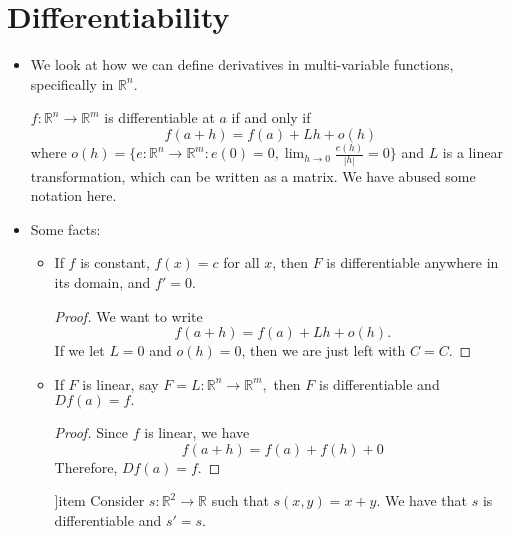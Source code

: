 \section{Differentiability}
\begin{itemize}
    \item We look at how we can define derivatives in multi-variable functions, specifically in $\mathbb{R}^n$.
    \begin{definition}
        $f:\mathbb{R}^n\rightarrow \mathbb{R}^m$ is differentiable at $a$ if and only if
        \begin{equation}
            f(a+h) = f(a) + Lh + o(h)
        \end{equation}
        where $o(h) = \{e:\mathbb{R}^n\rightarrow \mathbb{R}^m : e(0)=0, \lim_{h\to 0} \frac{e(h)}{|h|} = 0\}$ and $L$ is a linear transformation, which can be written as a matrix. We have abused some notation here.
    \end{definition}
    \item Some facts: 
    \begin{itemize}
        \item If $f$ is constant, $f(x)=c$ for all $x$, then $F$ is differentiable anywhere in its domain, and $f'=0.$
        \begin{proof}
            We want to write
            \begin{equation}
                f(a+h) = f(a) + Lh + o(h). 
            \end{equation}
            If we let $L=0$ and $o(h)=0$, then we are just left with $C=C.$
        \end{proof}
        \item If $F$ is linear, say $F=L:\mathbb{R}^n\rightarrow \mathbb{R}^m,$ then $F$ is differentiable and $Df(a)=f.$
        \begin{proof}
            Since $f$ is linear, we have 
            \begin{equation}
                f(a+h) = f(a) + f(h) + 0
            \end{equation}
            Therefore, $Df(a)=f.$
        \end{proof}
        ]item Consider $s:\mathbb{R}^2 \rightarrow \mathbb{R}$ such that $s(x,y)=x+y.$ We have that $s$ is differentiable and $s'=s.$
        

\end{itemize}
\end{itemize}

